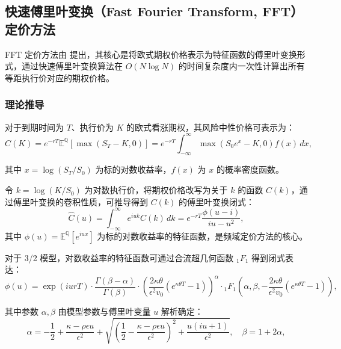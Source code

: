 \subsection {快速傅里叶变换（Fast Fourier Transform, FFT）定价方法}
FFT 定价方法由 \citet{carrOptionValuationUsing1999} 提出，其核心是将欧式期权价格表示为特征函数的傅里叶变换形式，通过快速傅里叶变换算法在 $O(N \log N)$ 的时间复杂度内一次性计算出所有等距执行价对应的期权价格。

\subsubsection{理论推导}

对于到期时间为 $T$、执行价为 $K$ 的欧式看涨期权，其风险中性价格可表示为：
\begin{equation}
C(K) = e^{-rT} \mathbb{E}^{\mathbb{Q}} \left[ \max(S_T - K, 0) \right] = e^{-rT} \int_{-\infty}^{\infty} \max(S_0 e^x - K, 0) f(x) \, dx,
\end{equation}

其中 $x = \log(S_T/S_0)$ 为标的对数收益率，$f(x)$ 为 $x$ 的概率密度函数。

令 $k = \log(K/S_0)$ 为对数执行价，将期权价格改写为关于 $k$ 的函数 $C(k)$，通过傅里叶变换的卷积性质，可推导得到 $C(k)$ 的傅里叶变换闭式：
\begin{equation}
  \hat{C}(u) = \int_{-\infty}^{\infty} e^{iuk} C(k) \, dk = e^{-rT} \frac{\phi(u - i)}{i u - u^2},
\end{equation}
其中 $\phi(u) = \mathbb{E}^{\mathbb{Q}} \left[ e^{iux} \right]$ 为标的对数收益率的特征函数，是频域定价方法的核心。

对于 3/2 模型，对数收益率的特征函数可通过合流超几何函数 $_1F_1$ 得到闭式表达：
\begin{equation}
\phi(u) = \exp\left( i u r T \right) \cdot \frac{\Gamma(\beta - \alpha)}{\Gamma(\beta)} \cdot \left( \frac{2 \kappa \theta}{\epsilon^2 v_0} \left( e^{\kappa \theta T} - 1 \right) \right)^{\alpha} \cdot {}_1F_1 \left( \alpha, \beta, -\frac{2 \kappa \theta}{\epsilon^2 v_0} \left( e^{\kappa \theta T} - 1 \right) \right),
\end{equation}

其中参数 $\alpha, \beta$ 由模型参数与傅里叶变量 $u$ 解析确定：
\begin{equation}
\alpha = -\frac{1}{2} + \frac{\kappa - \rho \epsilon u}{\epsilon^2} + \sqrt{\left( \frac{1}{2} - \frac{\kappa - \rho \epsilon u}{\epsilon^2} \right)^2 + \frac{u(iu + 1)}{\epsilon^2}}, \quad \beta = 1 + 2\alpha,
\end{equation}

